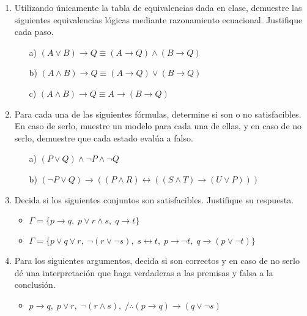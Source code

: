 \documentclass[letterpaper,11pt]{article}
\begin{document}
\begin{enumerate}
    \item Utilizando únicamente la tabla de equivalencias dada en clase, 
    demuestre las siguientes equivalencias lógicas mediante razonamiento 
    ecuacional. Justifique cada paso.

    \begin{itemize}
        \item[a)] $(A \lor B) \rightarrow Q \equiv (A \rightarrow Q) \land 
                   (B \rightarrow Q)$
        \item[b)] $(A \land B) \rightarrow Q \equiv (A \rightarrow Q) \lor 
                   (B \rightarrow Q)$
        \item[c)] $(A \land B) \rightarrow Q \equiv A \rightarrow (B 
                   \rightarrow Q)$
    \end{itemize}

    \item Para cada una de las siguientes fórmulas, determine si son o no 
    satisfacibles. En caso de serlo, muestre un modelo para cada una de ellas,
    y en caso de no serlo, demuestre que cada estado evalúa a falso.

    \begin{itemize}
        \item[a)] $(P \lor Q) \land \neg P \land \neg Q$
        \item[b)] $(\neg P \lor Q) \rightarrow ((P \land R) \leftrightarrow
                    ((S \land T) \rightarrow (U \lor P)))$
    \end{itemize}

    \item Decida si los siguientes conjuntos son satisfacibles. Justifique 
    su respuesta.

    \begin{itemize}
        \item $\Gamma = \{p \rightarrow q, \; p \lor r \land s, \;
                          q \rightarrow t\}$
        \item $\Gamma = \{p \lor q \lor r, \; \neg (r \lor \neg s), \; 
                          s \leftrightarrow t, \; p \rightarrow \neg t, \; 
                          q \rightarrow (p \lor \neg t)\}$        
    \end{itemize}

    \item Para los siguientes argumentos, decida si son correctos y en caso de 
    no serlo dé una interpretación que haga verdaderas a las premisas y falsa 
    a la conclusión.

    \begin{itemize}
        \item $p → q, \; p \lor r, \; \neg (r \land s), \; /∴
               (p → q) → (q \lor \neg s)$
    \end{itemize}
\end{enumerate}
\end{document}
